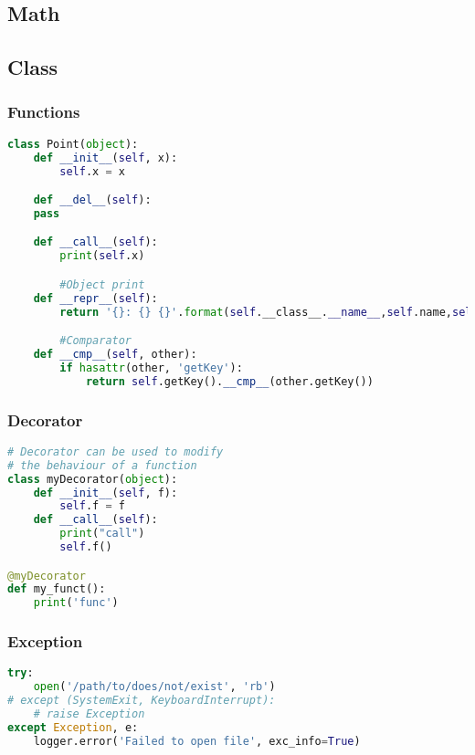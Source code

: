 \subsection{Math}


\subsection{Class}

\subsubsection{Functions}

\lstset{language=Python}
\begin{lstlisting}[language=Python]
class Point(object):
    def __init__(self, x):
        self.x = x

    def __del__(self):
    pass

    def __call__(self):
        print(self.x)

        #Object print
    def __repr__(self):
        return '{}: {} {}'.format(self.__class__.__name__,self.name,self.number)

        #Comparator
    def __cmp__(self, other):
        if hasattr(other, 'getKey'):
            return self.getKey().__cmp__(other.getKey())
\end{lstlisting}

\subsubsection{Decorator}
\begin{lstlisting}[language=Python]
# Decorator can be used to modify
# the behaviour of a function
class myDecorator(object):
    def __init__(self, f):
        self.f = f
    def __call__(self):
        print("call")
        self.f()

@myDecorator
def my_funct():
    print('func')
\end{lstlisting}


\subsubsection{Exception}
\begin{lstlisting}[language=Python]
try:
    open('/path/to/does/not/exist', 'rb')
# except (SystemExit, KeyboardInterrupt):
    # raise Exception
except Exception, e:
    logger.error('Failed to open file', exc_info=True)
\end{lstlisting}

